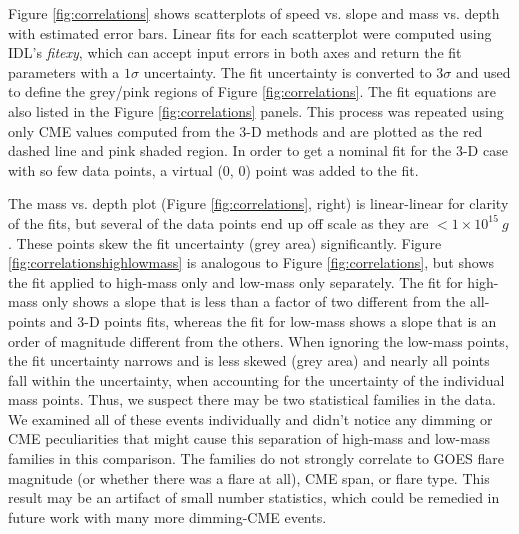 Figure \ref{fig:correlations} shows scatterplots of speed vs. slope and mass vs. depth with estimated error bars. Linear fits for each scatterplot were computed using IDL's \textit{fitexy}, which can accept input errors in both axes and return the fit parameters with a $1\sigma$ uncertainty. The fit uncertainty is converted to $3\sigma$ and used to define the grey/pink regions of Figure \ref{fig:correlations}. The fit equations are also listed in the Figure \ref{fig:correlations} panels. This process was repeated using only CME values computed from the 3-D methods and are plotted as the red dashed line and pink shaded region. In order to get a nominal fit for the 3-D case with so few data points, a virtual (0, 0) point was added to the fit. 

The mass vs. depth plot (Figure \ref{fig:correlations}, right) is linear-linear for clarity of the fits, but several of the data points end up off scale as they are $< 1 \times 10^{15}\ g$. These points skew the fit uncertainty (grey area) significantly. Figure \ref{fig:correlationshighlowmass} is analogous to Figure \ref{fig:correlations}, but shows the fit applied to high-mass only and low-mass only separately. The fit for high-mass only shows a slope that is less than a factor of two different from the all-points and 3-D points fits, whereas the fit for low-mass shows a slope that is an order of magnitude different from the others. When ignoring the low-mass points, the fit uncertainty narrows and is less skewed (grey area) and nearly all points fall within the uncertainty, when accounting for the uncertainty of the individual mass points. Thus, we suspect there may be two statistical families in the data. We examined all of these events individually and didn’t notice any dimming or CME peculiarities that might cause this separation of high-mass and low-mass families in this comparison. The families do not strongly correlate to GOES flare magnitude (or whether there was a flare at all), CME span, or flare type. This result may be an artifact of small number statistics, which could be remedied in future work with many more dimming-CME events. 

